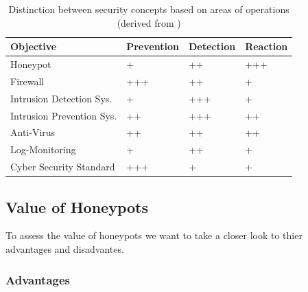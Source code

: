 \begin{table}[h]
    \centering
    \caption{Distinction between security concepts based on areas of operations (derived from \cite{NawrockiWSKS2016})}
    \begin{tabular}{l|lll}
        Objective                 & Prevention & Detection & Reaction \\ \hline
        Honeypot                  & +          & ++        & +++      \\
        Firewall                  & +++        & ++        & +        \\
        Intrusion Detection Sys.  & +          & +++       & +        \\
        Intrusion Prevention Sys. & ++         & +++       & ++       \\
        Anti-Virus                & ++         & ++        & ++       \\
        Log-Monitoring            & +          & ++        & +        \\
        Cyber Security Standard   & +++        & +         & +        \\
    \end{tabular}
    \label{tab:honeypots-security-concepts}
\end{table}

\subsection{Value of Honeypots}

To assess the value of honeypots we want to take a closer look to thier advantages and disadvantes.\cite{Mokube2007,Kaur2014, Spitzner2003}

\subsubsection{Advantages}

